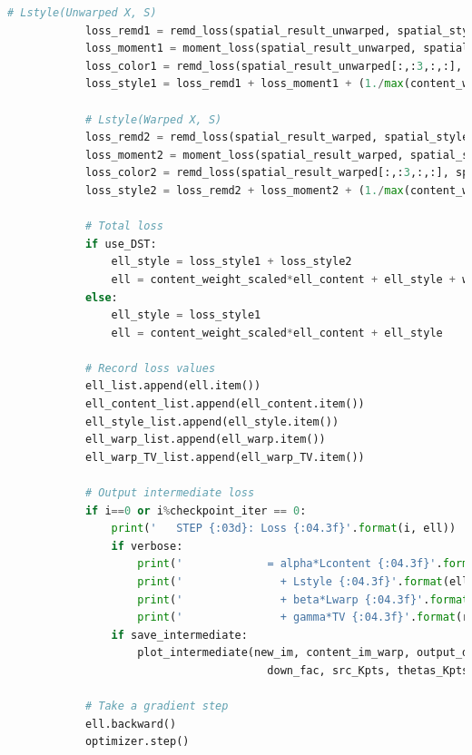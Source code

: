 \documentclass[10pt,UTF8]{ctexart}
\begin{document}
\begin{lstlisting}[language={python}]
            # Lstyle(Unwarped X, S)
            loss_remd1 = remd_loss(spatial_result_unwarped, spatial_style, cos_d=True)
            loss_moment1 = moment_loss(spatial_result_unwarped, spatial_style, moments=[1,2])
            loss_color1 = remd_loss(spatial_result_unwarped[:,:3,:,:], spatial_style[:,:3,:,:], cos_d=False)
            loss_style1 = loss_remd1 + loss_moment1 + (1./max(content_weight_scaled, 1.))*loss_color1

            # Lstyle(Warped X, S)
            loss_remd2 = remd_loss(spatial_result_warped, spatial_style, cos_d=True)
            loss_moment2 = moment_loss(spatial_result_warped, spatial_style, moments=[1,2])
            loss_color2 = remd_loss(spatial_result_warped[:,:3,:,:], spatial_style[:,:3,:,:], cos_d=False)
            loss_style2 = loss_remd2 + loss_moment2 + (1./max(content_weight_scaled, 1.))*loss_color2

            # Total loss
            if use_DST:
                ell_style = loss_style1 + loss_style2
                ell = content_weight_scaled*ell_content + ell_style + warp_weight*ell_warp + reg_weight*ell_warp_TV
            else:
                ell_style = loss_style1
                ell = content_weight_scaled*ell_content + ell_style

            # Record loss values
            ell_list.append(ell.item())
            ell_content_list.append(ell_content.item())
            ell_style_list.append(ell_style.item())
            ell_warp_list.append(ell_warp.item())
            ell_warp_TV_list.append(ell_warp_TV.item())

            # Output intermediate loss
            if i==0 or i%checkpoint_iter == 0:
                print('   STEP {:03d}: Loss {:04.3f}'.format(i, ell))
                if verbose:
                    print('             = alpha*Lcontent {:04.3f}'.format(content_weight_scaled*ell_content))
                    print('               + Lstyle {:04.3f}'.format(ell_style))
                    print('               + beta*Lwarp {:04.3f}'.format(warp_weight*ell_warp))
                    print('               + gamma*TV {:04.3f}'.format(reg_weight*ell_warp_TV))
                if save_intermediate:
                    plot_intermediate(new_im, content_im_warp, output_dir, output_prefix, colors,
                                        down_fac, src_Kpts, thetas_Kpts, target_Kpts, scale, i)

            # Take a gradient step
            ell.backward()
            optimizer.step()



\end{lstlisting}
\end{document}
